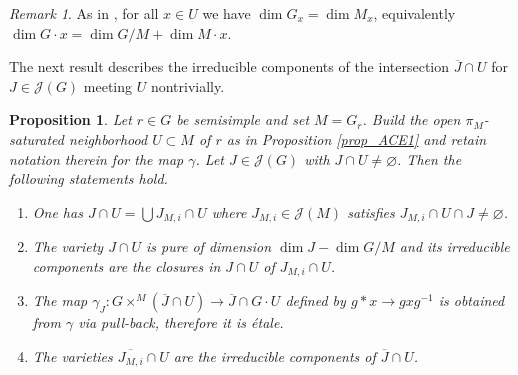 \documentclass[12pt]{amsart}
\newtheorem{Proposition}[Theorem]{Proposition}
\theoremstyle{definition}
\theoremstyle{remark}
\newtheorem{Remark}[Theorem]{Remark}
\begin{document}
\begin{Remark}\label{rk_ace}
As in \cite[Remark 4.2]{ACE}, for all $x \in U$ we have
 $\dim G_x = \dim M_x$, equivalently $\dim G \cdot x = \dim G/M + \dim M \cdot x$. 
\end{Remark}

The next result describes the irreducible components of the intersection $\overline{J} \cap U$ for $J \in \mathcal{J}(G)$ meeting $U$ nontrivially. 

\begin{Proposition} \label{prop_irrcomp}
Let $r \in G$ be semisimple and set $M = G_r$.
Build the open $\pi_M$-saturated neighborhood $U \subset M$ of $r$ as in Proposition \ref{prop_ACE1} and retain notation therein for the map $\gamma$.
Let $J \in \mathcal{J}(G)$ with $J \cap U \neq \varnothing$.
Then the following statements hold.
\begin{enumerate}
\item One has $J \cap U = \bigcup J_{M,i} \cap U$ where $J_{M,i} \in \mathcal{J}(M)$ satisfies $J_{M,i} \cap U \cap J \neq \varnothing$.
\item The variety $J \cap U$ is pure of dimension $\dim J - \dim G/M$ and its irreducible components are the closures in $J \cap U$ of $J_{M,i} \cap U$.
\item The map $\gamma_J \colon G \times^M (\overline{J} \cap U ) \to \overline{J} \cap G \cdot U$
defined by $g * x \to gxg^{-1}$ is obtained from $\gamma$ via pull-back, therefore it is \'etale.
\item The varieties $\overline{J_{M,i}} \cap U$ are the irreducible components of $\overline{J} \cap U$.
\end{enumerate}

\end{Proposition}
\end{document}
